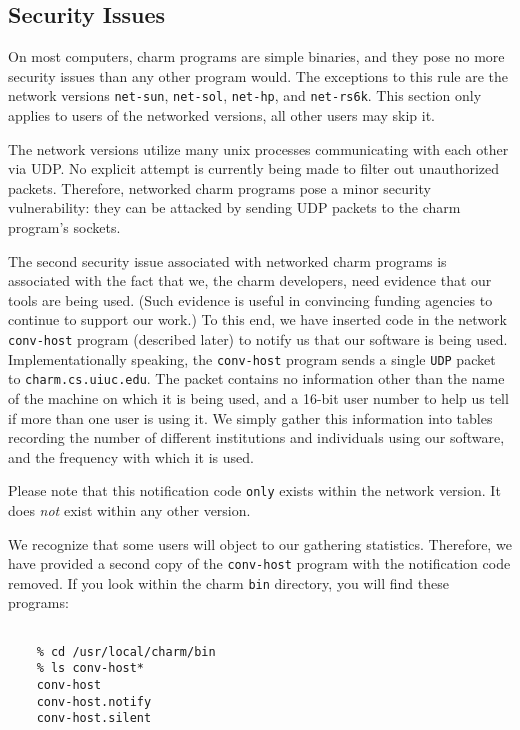 \subsection{Security Issues}

On most computers, charm programs are simple binaries, and they pose
no more security issues than any other program would.  The exceptions
to this rule are the network versions {\tt net-sun}, {\tt net-sol},
{\tt net-hp}, and {\tt net-rs6k}.  This section only applies to users
of the networked versions, all other users may skip it.

The network versions utilize many unix processes communicating with
each other via UDP.  No explicit attempt is currently being made to
filter out unauthorized packets.  Therefore, networked charm programs
pose a minor security vulnerability: they can be attacked by sending
UDP packets to the charm program's sockets.

The second security issue associated with networked charm programs is
associated with the fact that we, the charm developers, need evidence
that our tools are being used.  (Such evidence is useful in convincing
funding agencies to continue to support our work.)  To this end, we
have inserted code in the network {\tt conv-host} program (described
later) to notify us that our software is being used.
Implementationally speaking, the {\tt conv-host} program sends a
single {\tt UDP} packet to {\tt charm.cs.uiuc.edu}.  The packet
contains no information other than the name of the machine on which it
is being used, and a 16-bit user number to help us tell if more than
one user is using it.  We simply gather this information into tables
recording the number of different institutions and individuals using
our software, and the frequency with which it is used.

Please note that this notification code {\tt only} exists within the
network version.  It does {\em not} exist within any other version.

We recognize that some users will object to our gathering statistics.
Therefore, we have provided a second copy of the {\tt conv-host}
program with the notification code removed.  If you look within the
charm {\tt bin} directory, you will find these programs:

\begin{verbatim}

    % cd /usr/local/charm/bin
    % ls conv-host*
    conv-host
    conv-host.notify
    conv-host.silent

\end{verbatim}

